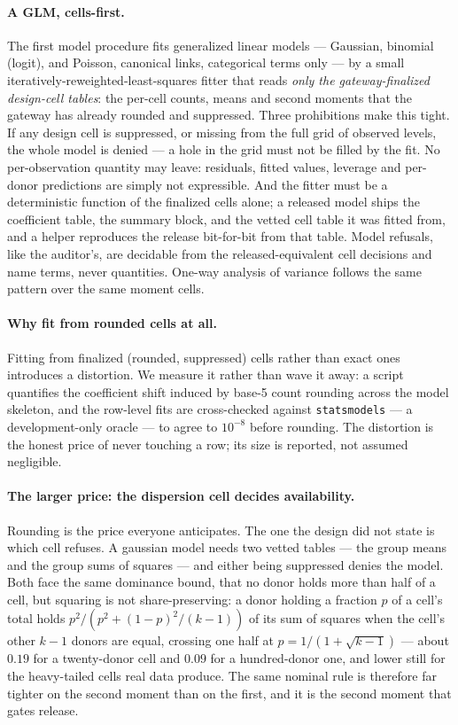 \documentclass[11pt,a4paper]{article}
\begin{document}
\paragraph{A GLM, cells-first.}
The first model procedure fits generalized linear models --- Gaussian,
binomial (logit), and Poisson, canonical links, categorical terms only --- by a
small iteratively-reweighted-least-squares fitter that reads
\emph{only the gateway-finalized design-cell tables}: the per-cell counts, means
and second moments that the gateway has already rounded and suppressed. Three
prohibitions make this tight. If any design cell is suppressed, or missing from
the full grid of observed levels, the whole model is denied --- a hole in the
grid must not be filled by the fit. No per-observation quantity may leave:
residuals, fitted values, leverage and per-donor predictions are simply not
expressible. And the fitter must be a deterministic function of the finalized
cells alone; a released model ships the coefficient table, the summary block,
and the vetted cell table it was fitted from, and a helper reproduces the
release bit-for-bit from that table. Model refusals, like the auditor's, are
decidable from the released-equivalent cell decisions and name terms, never
quantities. One-way analysis of variance follows the same pattern over the same
moment cells.

\paragraph{Why fit from rounded cells at all.}
Fitting from finalized (rounded, suppressed) cells rather than exact ones
introduces a distortion. We measure it rather than wave it away: a script
quantifies the coefficient shift induced by base-5 count rounding across the
model skeleton, and the row-level fits are cross-checked against
\texttt{statsmodels} --- a development-only oracle --- to agree to $10^{-8}$
before rounding. The distortion is the honest price of never touching a row;
its size is reported, not assumed negligible.

\paragraph{The larger price: the dispersion cell decides availability.}
Rounding is the price everyone anticipates. The one the design did not state is
which cell refuses. A gaussian model needs two vetted tables --- the group means
and the group sums of squares --- and either being suppressed denies the model.
Both face the same dominance bound, that no donor holds more than half of a
cell, but squaring is not share-preserving: a donor holding a fraction $p$ of a
cell's total holds $p^2/(p^2 + (1-p)^2/(k-1))$ of its sum of squares when the
cell's other $k-1$ donors are equal, crossing one half at
$p = 1/(1+\sqrt{k-1})$ --- about $0.19$ for a twenty-donor cell and $0.09$ for a
hundred-donor one, and lower still for the heavy-tailed cells real data produce.
The same nominal rule is therefore far tighter on the second moment than on the
first, and it is the second moment that gates release.
\end{document}
